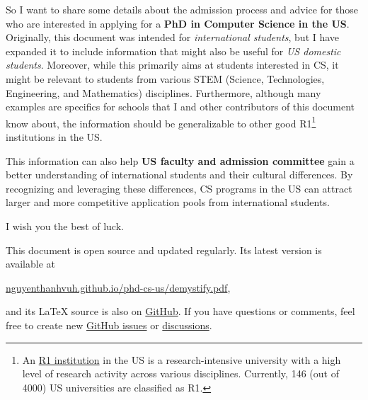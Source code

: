 \documentclass[oneside,11pt,dvipsnames]{book}
\begin{document}
So I want to share some details about the admission process and advice for those who are interested in applying for a \textbf{PhD in Computer Science in the US}.
Originally, this document was intended for \emph{international students}, but I have expanded it to include information that might also be useful for \emph{US domestic students}.
Moreover, while this primarily aims at students interested in CS, it might be relevant to students from various STEM (Science, Technologies, Engineering, and Mathematics) disciplines.
Furthermore, although many examples are specifics for schools that I and other contributors of this document know about, the information should be generalizable to other good R1\footnote{An \href{https://en.wikipedia.org/wiki/List_of_research_universities_in_the_United_States}{R1 institution} in the US is a research-intensive university with a high level of research activity across various disciplines. Currently, 146 (out of 4000) US universities are classified as R1.} institutions in the US.

This information can also help \textbf{US faculty and admission committee} gain a better understanding of international students and their cultural differences.  By recognizing and leveraging these differences, CS programs in the US can attract larger and more competitive application pools from international students.

I wish you the best of luck.

\begin{mybox}
This document is open source and updated regularly. Its latest version is available at

\begin{center}
  \href{https://nguyenthanhvuh.github.io/phd-cs-us/demystify.pdf}{nguyenthanhvuh.github.io/phd-cs-us/demystify.pdf},
\end{center}

\noindent and its \LaTeX{} source is also on \href{https://github.com/nguyenthanhvuh/phd-cs-us}{GitHub}. If you have questions or comments, feel free to create new \href{https://github.com/nguyenthanhvuh/phd-cs-us/issues}{GitHub issues} or \href{https://github.com/nguyenthanhvuh/phd-cs-us/discussions}{discussions}.

\end{mybox}

\newpage
\tableofcontents
\end{document}
